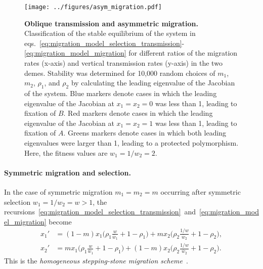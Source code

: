 \documentclass[14pt]{extarticle}
\begin{document}
\begin{figure*}[hbt]
\centering
\texttt{[image: ../figures/asym\_migration.pdf]}
\caption{
\textbf{Oblique transmission and asymmetric migration.}
Classification of the stable equilibrium of the system in eqs.~\ref{eq:migration_model_selection_transmission}-\ref{eq:migration_model_migration} for different ratios of the migration rates (x-axis) and vertical transmission rates (y-axis) in the two demes.
Stability was determined for 10,000 random choices of $m_1$, $m_2$, $\rho_1$, and $\rho_2$ by calculating the leading eigenvalue of the Jacobian of the system.
Blue markers denote cases in which the leading eigenvalue of the Jacobian at $x_1=x_2=0$ was less than 1, leading to fixation of $B$.
Red markers denote cases in which the leading eigenvalue of the Jacobian at $x_1=x_2=1$ was less than 1, leading to fixation of $A$.
Greens markers denote cases in which both leading eigenvalues were larger than 1, leading to a protected polymorphism.
Here, the fitness values are $w_1=1/w_2=2$.
}
\label{fig:asym_migration}
\end{figure*}


\paragraph{Symmetric migration and selection.}
 
In the case of symmetric migration $m_1=m_2=m$ occurring after symmetric selection $w_1=1/w_2=w>1$, the recursions~\eqref{eq:migration_model_selection_transmission}~and~\eqref{eq:migration_model_migration} become
\begin{equation}\begin{aligned} \label{eq:migration_model_unconditional_symmetric}
x_1' &= (1-m)x_1\Big(\rho_1 \frac{w}{\overline w_1} + 1-\rho_1 \Big) + m x_2\Big(\rho_2 \frac{1/w}{\overline w_2} + 1-\rho_2 \Big), \\
x_2' &= m x_1\Big(\rho_1 \frac{w}{\overline w_1} + 1-\rho_1 \Big) + (1-m) x_2\Big(\rho_2 \frac{1/w}{\overline w_2} + 1-\rho_2 \Big).
\end{aligned}
\end{equation}
This is the \emph{homogeneous stepping-stone migration scheme}~\citep[][eq.~2.14]{Karlin1982}.
\end{document}
